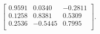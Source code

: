 \begin{equation*}
\begin{bmatrix}
  0.9591 &   0.0340 &  -0.2811 \\
  0.1258 &   0.8381 &   0.5309 \\
  0.2536 &  -0.5445 &   0.7995 \\
\end{bmatrix}.
\end{equation*}
